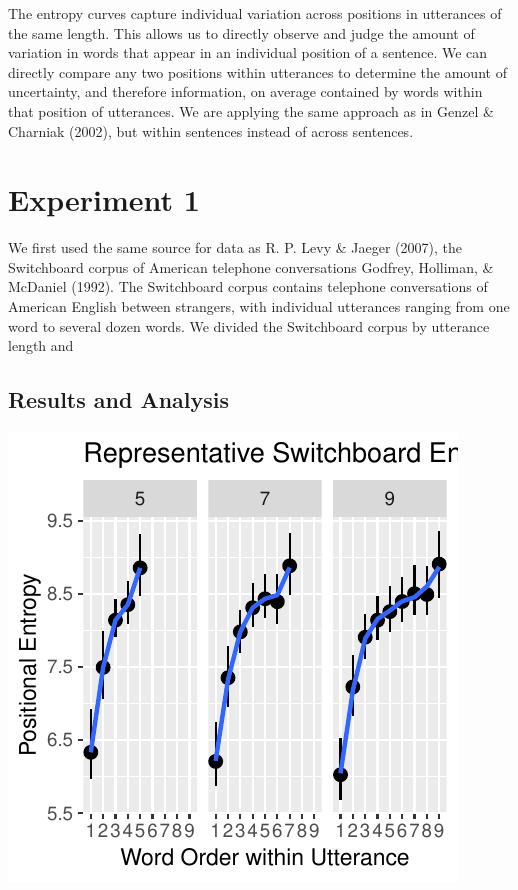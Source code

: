 \documentclass[10pt, letterpaper]{article}
\newenvironment{CodeChunk}{}{}
\begin{document}
The entropy curves capture individual variation across positions in
utterances of the same length. This allows us to directly observe and
judge the amount of variation in words that appear in an individual
position of a sentence. We can directly compare any two positions within
utterances to determine the amount of uncertainty, and therefore
information, on average contained by words within that position of
utterances. We are applying the same approach as in Genzel \& Charniak
(2002), but within sentences instead of across sentences.

\section{Experiment 1}\label{experiment-1}

We first used the same source for data as R. P. Levy \& Jaeger (2007),
the Switchboard corpus of American telephone conversations Godfrey,
Holliman, \& McDaniel (1992). The Switchboard corpus contains telephone
conversations of American English between strangers, with individual
utterances ranging from one word to several dozen words. We divided the
Switchboard corpus by utterance length and

\subsection{Results and Analysis}\label{results-and-analysis}

\begin{CodeChunk}

\includegraphics{figs/read_and_plot_switchboard-1} \end{CodeChunk}
\end{document}
